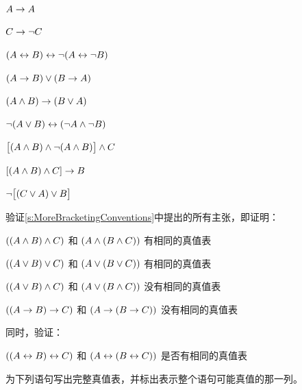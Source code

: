 \begin{compactlist}
\item $A \rightarrow A$ %
\item $C \rightarrow\neg C$ %
\item $(A \leftrightarrow B) \leftrightarrow \neg(A\leftrightarrow \neg B)$ %
\item $(A \rightarrow B) \vee (B \rightarrow A)$ %
\item $(A \wedge B) \rightarrow (B \vee A)$  %
\item $\neg(A \vee B) \leftrightarrow (\neg A \wedge \neg B)$ %
\item $\bigl[(A\wedge B) \wedge\neg(A\wedge B)\bigr] \wedge C$ %
\item $[(A \wedge B) \wedge C] \rightarrow B$ %
\item $\neg\bigl[(C\vee A) \vee B\bigr]$ %
\end{compactlist}


\problempart
验证\cref{s:MoreBracketingConventions}中提出的所有主张，即证明：


\begin{compactlist}
	\item $((A \wedge B) \wedge C)$ 和 $(A \wedge (B \wedge C))$ 有相同的真值表
	\item $((A \vee B) \vee C)$ 和 $(A \vee (B \vee C))$ 有相同的真值表
	\item $((A \vee B) \wedge C)$ 和 $(A \vee (B \wedge C))$ 没有相同的真值表
	\item $((A \rightarrow B) \rightarrow C)$ 和 $(A \rightarrow (B \rightarrow C))$ 没有相同的真值表
\end{compactlist}


同时，验证：


\begin{compactlist}
	\item[5.] $((A \leftrightarrow B) \leftrightarrow C)$ 和 $(A \leftrightarrow (B \leftrightarrow C))$ 是否有相同的真值表
\end{compactlist}

\problempart
为下列语句写出完整真值表，并标出表示整个语句可能真值的那一列。

